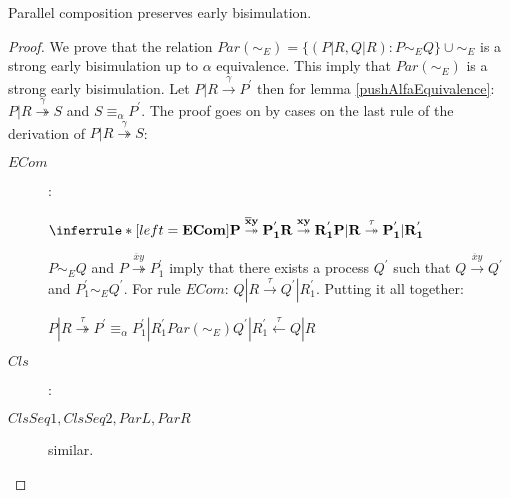 \begin{lemma}
  Parallel composition preserves early bisimulation.
  \begin{proof}
    We prove that the relation $Par(\sim_{E})=\{(P|R, Q|R): P\sim_{E} Q\} \cup \sim_{E}$ is a strong early bisimulation up to $\alpha$ equivalence. This imply that $Par(\sim_{E})$ is a strong early bisimulation. Let $P|R \xrightarrow{\gamma} P^{'}$ then for lemma \ref{pushAlfaEquivalence}: $P|R \stackrel{\gamma}{\twoheadrightarrow} S$ and $S\equiv_{\alpha} P^{'}$. The proof goes on by cases on the last rule of the derivation of $P|R \stackrel{\gamma}{\twoheadrightarrow} S$:
    \begin{description}
      \item[$ECom$]:
	    \begin{center}
	      $\inferrule* [left=\bf{ECom}]{
		      P \stackrel{\overline{x}y}{\twoheadrightarrow} P_{1}^{'}
		    \\
		      R \stackrel{xy}{\twoheadrightarrow} R_{1}^{'}
		  }{
		    P|R \stackrel{\tau}{\twoheadrightarrow} P_{1}^{'}|R_{1}^{'}
		  }$
	    \end{center}
	$P\sim_{E} Q$ and $P \stackrel{\overline{x}y}{\twoheadrightarrow} P_{1}^{'}$ imply that there exists a process $Q^{'}$ such that $Q \xrightarrow{\overline{x}y} Q^{'}$ and $P_{1}^{'}\sim_{E} Q^{'}$. For rule $ECom$: $Q|R \xrightarrow{\tau} Q^{'}|R_{1}^{'}$. Putting it all together:
	\begin{center}
	  $P|R \stackrel{\tau}{\twoheadrightarrow} P^{'} \equiv_{\alpha} P_{1}^{'}|R_{1}^{'} Par(\sim_{E}) Q^{'}|R_{1}^{'} \stackrel{\tau}{\leftarrow} Q|R$
	\end{center}

      \item[$Cls$]:
      \item[$ClsSeq1, ClsSeq2, ParL, ParR$] similar.
    \end{description}
  \end{proof}
\end{lemma}


